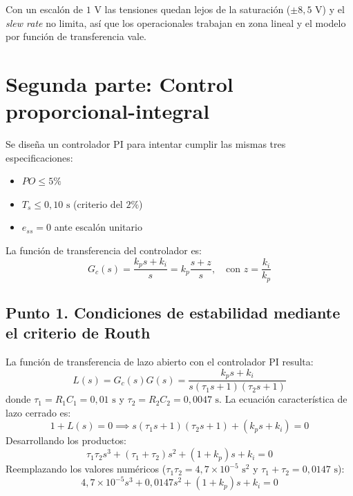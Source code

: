 \documentclass[11pt,a4paper]{article}
\begin{document}
Con un escalón de $1\text{ V}$ las tensiones quedan lejos de la saturación ($\pm 8{,}5\text{ V}$) y el \textit{slew rate} no limita, así que los operacionales trabajan en zona lineal y el modelo por función de transferencia vale.

\newpage

\section*{Segunda parte: Control proporcional-integral}

Se diseña un controlador PI para intentar cumplir las mismas tres especificaciones:
\begin{itemize}
    \item $PO \le 5\%$
    \item $T_s \le 0{,}10\text{ s}$ (criterio del $2\%$)
    \item $e_{ss} = 0$ ante escalón unitario
\end{itemize}

La función de transferencia del controlador es:
\begin{equation}
    G_c(s) = \frac{k_p s + k_i}{s} = k_p \frac{s + z}{s}, \quad \text{con } z = \frac{k_i}{k_p}
\end{equation}

\subsection*{Punto 1. Condiciones de estabilidad mediante el criterio de Routh}

La función de transferencia de lazo abierto con el controlador PI resulta:
\begin{equation}
    L(s) = G_c(s) G(s) = \frac{k_p s + k_i}{s (\tau_1 s + 1)(\tau_2 s + 1)}
\end{equation}
donde $\tau_1 = R_1 C_1 = 0{,}01\text{ s}$ y $\tau_2 = R_2 C_2 = 0{,}0047\text{ s}$. La ecuación característica de lazo cerrado es:
\begin{equation}
    1 + L(s) = 0 \implies s (\tau_1 s + 1)(\tau_2 s + 1) + (k_p s + k_i) = 0
\end{equation}
Desarrollando los productos:
\begin{equation}
    \tau_1 \tau_2 s^3 + (\tau_1 + \tau_2) s^2 + (1 + k_p) s + k_i = 0
\end{equation}
Reemplazando los valores numéricos ($\tau_1 \tau_2 = 4{,}7\times 10^{-5}\text{ s}^2$ y $\tau_1 + \tau_2 = 0{,}0147\text{ s}$):
\begin{equation}
    4{,}7\times 10^{-5} s^3 + 0{,}0147 s^2 + (1 + k_p) s + k_i = 0
\end{equation}
\end{document}
